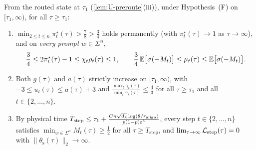 \begin{lemma}
\label{lem:U-postroute}
From the routed state at $\tau_1$ (\cref{lem:U-preroute}(iii)), under Hypothesis~(F) on $[\tau_1, \infty)$, for all $\tau \ge \tau_1$:
\begin{enumerate}[label=(\roman*),leftmargin=*]
\item $\min_{2\le t\le n}\pi_t^\star(\tau) > \frac{7}{8} > \frac{3}{4}$ holds permanently (with $\pi_t^\star(\tau) \to 1$ as $\tau \to \infty$), and on \emph{every prompt} $w \in \Sigma^n$,
\begin{equation}
 \frac{3}{4} \le 2\pi_t^\star(\tau) - 1 \le \chi_t\rho_t(\tau) \le 1, \qquad
 \frac{3}{4}\,\mathbb E\bigl[\sigma(-M_t)\bigr] \le \mu_t(\tau) \le \mathbb E\bigl[\sigma(-M_t)\bigr].
 \label{eq:U-pointwise-rho}
\end{equation}
\item Both $g(\tau)$ and $a(\tau)$ strictly increase on $[\tau_1, \infty)$, with $-3 \le u_t(\tau) \le a(\tau) + 3$ and $\frac{\max_t\gamma_t(\tau)}{\min_t\gamma_t(\tau)} \le \frac{4}{3}$ for all $\tau \ge \tau_1$ and all $t \in \{2,\ldots,n\}$.
\item By physical time $T_{\mathrm{step}} \le \tau_1 + \frac{C n\sqrt{d_k}\log(8/r_{\mathrm{align}})}{p(1-p)\varepsilon^5}$, every step $t \in \{2,\ldots,n\}$ satisfies $\min_{w\in\Sigma^n} M_t(\tau) \ge \frac{1}{2}$ for all $\tau \ge T_{\mathrm{step}}$, and $\lim_{\tau\to\infty}\mathcal L_{\mathrm{step}}(\tau) = 0$ with $\|\theta_{\mathrm s}(\tau)\|_2 \to \infty$.
\end{enumerate}
\end{lemma}
